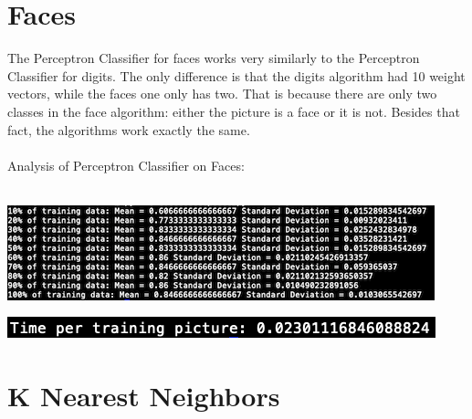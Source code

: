 \documentclass[12pt]{article}
\begin{document}
\section*{Faces}
The Perceptron Classifier for faces works very similarly to the Perceptron Classifier for digits. The only difference is that the digits algorithm had 10 weight vectors, while the faces one only has two. That is because there are only two classes in the face algorithm: either the picture is a face or it is not. Besides that fact, the algorithms work exactly the same.\\\\
Analysis of Perceptron Classifier on Faces:\\\\

\begin{center}
\includegraphics{statsFacePerceptron.png}
\end{center}

\begin{center}
\includegraphics{timeStatsFacePerceptron.png}
\end{center}

\section*{K Nearest Neighbors}
\end{document}
